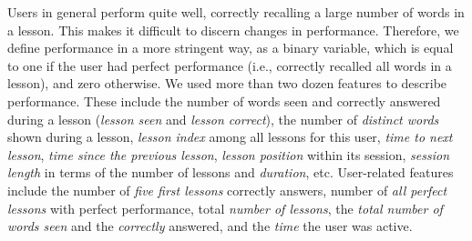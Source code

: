 \documentclass[letterpaper]{article} %
\begin{document}
Users in general perform quite well, correctly recalling a large number of words in a lesson. This makes it difficult to discern changes in performance. Therefore, we define performance in a more stringent way, as a binary variable, which is equal to one if the user had perfect performance (i.e., correctly recalled all words in a lesson), and zero otherwise.  We used more than two dozen features to describe performance. These include the number of words seen and correctly answered  during a lesson (\emph{lesson seen} and \emph{lesson correct}), the number of \emph{distinct words} shown during a lesson, \emph{lesson index} among all lessons for this user, \emph{time to next lesson}, \emph{time since the previous lesson}, \emph{lesson position} within its session, \emph{session length} in terms of the number of lessons and \emph{duration}, etc. User-related features include the number of \emph{five first lessons} correctly answers, number of \emph{all perfect lessons} with perfect performance, total \emph{number of lessons},  the \emph{total number of words seen} and the \emph{correctly} answered, and the \emph{time} the user was active.
\end{document}
